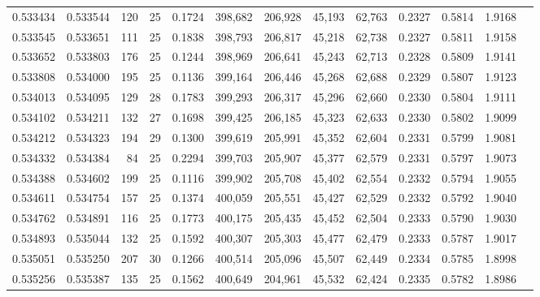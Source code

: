 \begin{tabular}{rrrrrrrrrrrrr}
0.533434 & 0.533544 &   120 &  25 &                                     0.1724 & 398,682 & 206,928 &  45,193 &  62,763 & 0.2327 & 0.5814 & 1.9168 \\
0.533545 & 0.533651 &   111 &  25 &                                     0.1838 & 398,793 & 206,817 &  45,218 &  62,738 & 0.2327 & 0.5811 & 1.9158 \\
0.533652 & 0.533803 &   176 &  25 &                                     0.1244 & 398,969 & 206,641 &  45,243 &  62,713 & 0.2328 & 0.5809 & 1.9141 \\
0.533808 & 0.534000 &   195 &  25 &                                     0.1136 & 399,164 & 206,446 &  45,268 &  62,688 & 0.2329 & 0.5807 & 1.9123 \\
0.534013 & 0.534095 &   129 &  28 &                                     0.1783 & 399,293 & 206,317 &  45,296 &  62,660 & 0.2330 & 0.5804 & 1.9111 \\
0.534102 & 0.534211 &   132 &  27 &                                     0.1698 & 399,425 & 206,185 &  45,323 &  62,633 & 0.2330 & 0.5802 & 1.9099 \\
0.534212 & 0.534323 &   194 &  29 &                                     0.1300 & 399,619 & 205,991 &  45,352 &  62,604 & 0.2331 & 0.5799 & 1.9081 \\
0.534332 & 0.534384 &    84 &  25 &                                     0.2294 & 399,703 & 205,907 &  45,377 &  62,579 & 0.2331 & 0.5797 & 1.9073 \\
0.534388 & 0.534602 &   199 &  25 &                                     0.1116 & 399,902 & 205,708 &  45,402 &  62,554 & 0.2332 & 0.5794 & 1.9055 \\
0.534611 & 0.534754 &   157 &  25 &                                     0.1374 & 400,059 & 205,551 &  45,427 &  62,529 & 0.2332 & 0.5792 & 1.9040 \\
0.534762 & 0.534891 &   116 &  25 &                                     0.1773 & 400,175 & 205,435 &  45,452 &  62,504 & 0.2333 & 0.5790 & 1.9030 \\
0.534893 & 0.535044 &   132 &  25 &                                     0.1592 & 400,307 & 205,303 &  45,477 &  62,479 & 0.2333 & 0.5787 & 1.9017 \\
0.535051 & 0.535250 &   207 &  30 &                                     0.1266 & 400,514 & 205,096 &  45,507 &  62,449 & 0.2334 & 0.5785 & 1.8998 \\
0.535256 & 0.535387 &   135 &  25 &                                     0.1562 & 400,649 & 204,961 &  45,532 &  62,424 & 0.2335 & 0.5782 & 1.8986 \\

\end{tabular}
